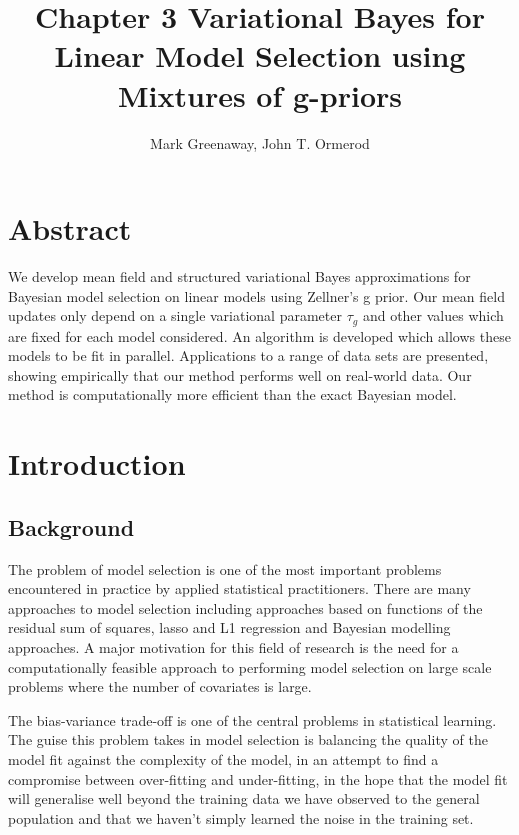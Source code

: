 \documentclass{amsart}[12pt]
\title{Chapter 3 Variational Bayes for Linear Model Selection using Mixtures of g-priors}
\author{Mark Greenaway, John T. Ormerod}
\begin{document}
\maketitle

\section*{Abstract}


We develop mean field and structured variational Bayes approximations for Bayesian model selection on linear
models using Zellner's g prior. Our mean field updates only depend on a single variational parameter $\tau_g$
and other values which are fixed for each model considered. An algorithm is developed which allows these
models to be fit in parallel. Applications to a range of data sets are presented, showing  empirically that
our method performs well on real-world data. Our method is computationally more efficient  than the exact
Bayesian model.

\section{Introduction}

\subsection{Background}


The problem of model selection is one of the most important problems encountered in practice by applied
statistical practitioners. There are many approaches to model selection including approaches based on
functions of the residual sum of squares, lasso and L1 regression and Bayesian modelling approaches. A major
motivation for this field of research is the need for a computationally feasible approach to performing model
selection on large scale problems where the number of covariates is large.

The bias-variance trade-off is one of the central problems in statistical learning. The guise this problem
takes in model selection is balancing the quality of the model fit against the complexity of the model, in an
attempt to find a compromise between over-fitting and under-fitting, in the hope that the model fit will
generalise well beyond the training data we have observed to the general population and that we haven't simply
learned the noise in the training set.
\end{document}
